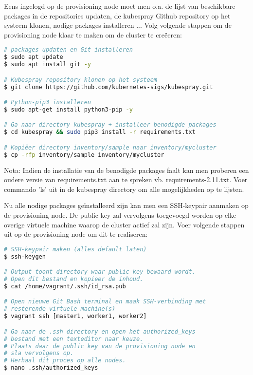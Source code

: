 Eens ingelogd op de provisioning node moet men o.a. de lijst van beschikbare packages in de repositories updaten, de kubespray Github repository op het systeem klonen, nodige packages installeren ... Volg volgende stappen om de provisioning node klaar te maken om de cluster te creëeren:

\begin{lstlisting}[language=bash]
# packages updaten en Git installeren
$ sudo apt update
$ sudo apt install git -y

# Kubespray repository klonen op het systeem
$ git clone https://github.com/kubernetes-sigs/kubespray.git

# Python-pip3 installeren
$ sudo apt-get install python3-pip -y

# Ga naar directory kubespray + installeer benodigde packages
$ cd kubespray && sudo pip3 install -r requirements.txt

# Kopiëer directory inventory/sample naar inventory/mycluster
$ cp -rfp inventory/sample inventory/mycluster    
\end{lstlisting}
 
Nota: Indien de installatie van de benodigde packages faalt kan men proberen een oudere versie van requirements.txt aan te spreken vb. requirements-2.11.txt. Voer commando 'ls' uit in de kubespray directory om alle mogelijkheden op te lijsten.

Nu alle nodige packages geïnstalleerd zijn kan men een SSH-keypair aanmaken op de provisioning node. De public key zal vervolgens toegevoegd worden op elke overige virtuele machine waarop de cluster actief zal zijn. Voer volgende stappen uit op de provisioning node om dit te realiseren:

\begin{lstlisting}[language=bash]
# SSH-keypair maken (alles default laten)
$ ssh-keygen

# Output toont directory waar public key bewaard wordt.
# Open dit bestand en kopieer de inhoud.
$ cat /home/vagrant/.ssh/id_rsa.pub

# Open nieuwe Git Bash terminal en maak SSH-verbinding met 
# resterende virtuele machine(s)
$ vagrant ssh [master1, worker1, worker2]

# Ga naar de .ssh directory en open het authorized_keys 
# bestand met een texteditor naar keuze. 
# Plaats daar de public key van de provisioning node en 
# sla vervolgens op.
# Herhaal dit proces op alle nodes.
$ nano .ssh/authorized_keys    
\end{lstlisting} 

